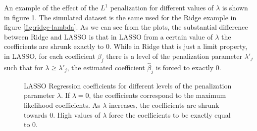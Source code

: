 \documentclass[a4paper, nobind]{templates/ociamthesis}
\theoremstyle{definition}
\theoremstyle{definition}
\theoremstyle{definition}
\theoremstyle{remark}
\begin{document}
An example of the effect of the \(L^1\) penalization for different values of \(\lambda\) is shown in figure \ref{fig:lasso-lambda}. The simulated dataset is the same used for the Ridge example in figure \ref{fig:ridge-lambda}. As we can see from the plots, the substantial difference between Ridge and LASSO is that in LASSO from a certain value of \(\lambda\) the coefficients are shrunk exactly to \(0\). While in Ridge that is just a limit property, in LASSO, for each coefficient \(\beta_j\) there is a level of the penalization parameter \(\lambda'_j\) such that for \(\lambda \ge \lambda'_j\), the estimated coefficient \(\hat{\beta}_j\) is forced to exactly \(0\).







\begin{figure}[!hbtp]

{\centering {}\newline{}\newline{}

}

\caption[The Bias-Variance trade off. LASSO Regression coefficients for different levels of the penalization parameter \(\lambda\).]{LASSO Regression coefficients for different levels of the penalization parameter \(\lambda\). If \(\lambda=0\), the coefficients correspond to the maximum likelihood coefficients. As \(\lambda\) increases, the coefficients are shrunk towards \(0\). High values of \(\lambda\) force the coefficients to be exactly equal to \(0\).}\label{fig:lasso-lambda}
\end{figure}
\end{document}
